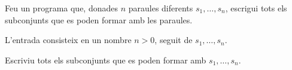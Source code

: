 

\Statement

Feu un programa que,
donades $n$ paraules diferents $s_1, \dots, s_n$,
escrigui tots els subconjunts que es poden formar amb les paraules.


\Input

L'entrada consisteix en un nombre $n > 0$,
seguit de $s_1, \dots, s_n$.


\Output

Escriviu tots els subconjunts que es poden formar
amb $s_1, \dots, s_n$.


\ObservationElasticII


\Sample
